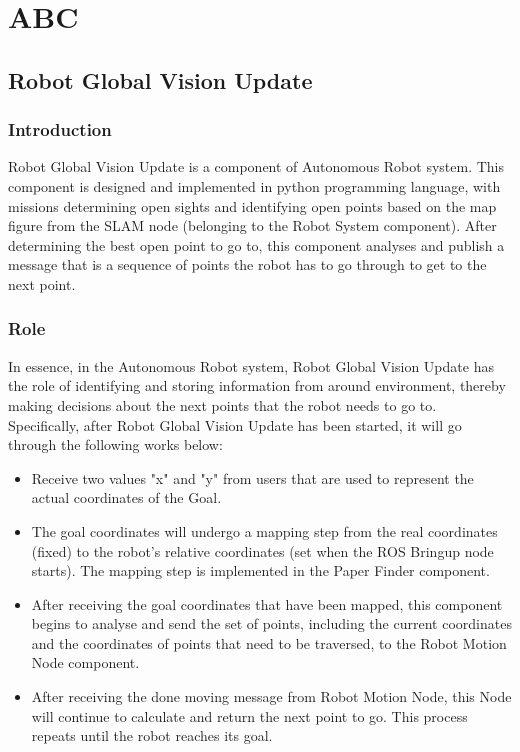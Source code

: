 \documentclass[13pt,a4paper]{article}
\begin{document}
	\section{ABC}	
	\newpage
	
	\subsection{Robot Global Vision Update}
	\subsubsection{Introduction}
	Robot Global Vision Update is a component of Autonomous Robot system. This component is designed and implemented in python programming language, with missions determining open sights and identifying open points based on the map figure from the SLAM node (belonging to the Robot System component). After determining the best open point to go to, this component analyses and publish a message that is a sequence of points the robot has to go through to get to the next point.
	\subsubsection{Role}
	In essence, in the Autonomous Robot system, Robot Global Vision Update has the role of identifying and storing information from around environment, thereby making decisions about the next points that the robot needs to go to. \\
	Specifically, after Robot Global Vision Update has been started, it will go through the following works below:
	\begin{itemize}
		\item Receive two values "x" and "y" from users that are used to represent the actual coordinates of the Goal.
		\item The goal coordinates will undergo a mapping step from the real coordinates (fixed) to the robot's relative coordinates (set when the ROS Bringup node starts). The mapping step is implemented in the Paper Finder component.
		\item After receiving the goal coordinates that have been mapped, this component begins to analyse and send the set of points, including the current coordinates and the coordinates of points that need to be traversed, to the Robot Motion Node component.
		\item After receiving the done moving message from Robot Motion Node, this Node will continue to calculate and return the next point to go. This process repeats until the robot reaches its goal.
	\end{itemize}
	
\end{document}
